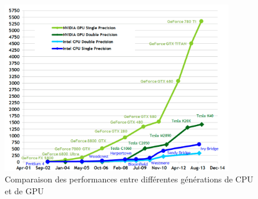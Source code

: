\begin{enumerate}
\begin{itemize}
                        \begin{figure}
                        \center
                        \includegraphics[width=10cm]{images/CPUvsGPU.png}
                        \caption{\label{fig:CPUvsGPU} Comparaison des performances entre différentes générations de CPU et de GPU}
                        \end{figure}
                     
                    
                    
                    
                    
                        

\end{itemize}
\end{enumerate}
